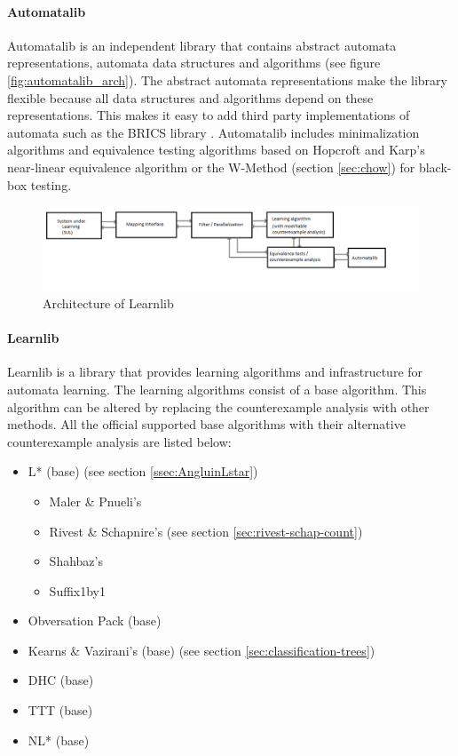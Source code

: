 \documentclass[multi,crop=false,class=article]{standalone}
\begin{document}
\paragraph{Automatalib} Automatalib is an independent library that contains 
abstract automata representations, automata data structures and algorithms (see 
figure \ref{fig:automatalib_arch}). The 
abstract automata representations make the library flexible because all data 
structures and algorithms depend on these representations. This makes it easy 
to add third party implementations of automata such as the BRICS library 
\cite{Alur2005}. Automatalib includes minimalization algorithms and equivalence 
testing algorithms based on Hopcroft and Karp's near-linear equivalence 
algorithm \cite{Hopcroft1971} or the W-Method (section \ref{sec:chow}) for 
black-box testing.

\begin{figure}[!ht]
	\includegraphics[width=\textwidth]{Tool_images/learnlib_architecture.png}
	\caption{Architecture of Learnlib}
	\label{fig:learnlib_arch}
\end{figure}

\paragraph{Learnlib} Learnlib is a library that provides learning algorithms and
infrastructure for automata learning. The learning algorithms consist of a base 
algorithm. This algorithm can be altered by replacing the counterexample 
analysis with other methods. All the official supported base algorithms with 
their alternative counterexample analysis are listed below:

\begin{itemize}
	\item L* (base) (see section \ref{ssec:AngluinLstar})
	\begin{itemize}
		\item Maler \& Pnueli's \cite{Maler1995}
		\item Rivest \& Schapnire's (see section \ref{sec:rivest-schap-count})
		\item Shahbaz's \cite{Shahbaz2009}
		\item Suffix1by1 \cite{Irfan2010}
	\end{itemize}
	\item Obversation Pack (base) \cite{Howar2012a}
	\item Kearns \& Vazirani's (base) (see section 
	\ref{sec:classification-trees})
	\item DHC (base) \cite{Merten2012}
	\item TTT (base) 
	\item NL* (base) \cite{Bollig2009}
\end{itemize}
\end{document}
